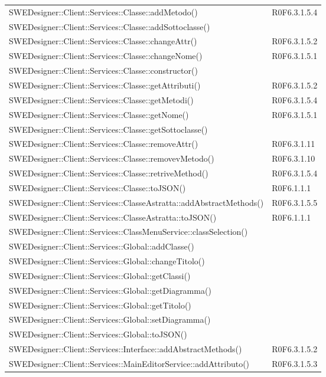 \begin{center}
\begin{longtable}{p{13cm}!{\VRule[1pt]}p{2cm}}
SWEDesigner::Client::Services::Classe::addMetodo() & R0F6.3.1.5.4\\
SWEDesigner::Client::Services::Classe::addSottoclasse() & \\
SWEDesigner::Client::Services::Classe::changeAttr() & R0F6.3.1.5.2\\
SWEDesigner::Client::Services::Classe::changeNome() & R0F6.3.1.5.1\\
SWEDesigner::Client::Services::Classe::constructor() & \\
SWEDesigner::Client::Services::Classe::getAttributi() & R0F6.3.1.5.2\\
SWEDesigner::Client::Services::Classe::getMetodi() & R0F6.3.1.5.4\\
SWEDesigner::Client::Services::Classe::getNome() & R0F6.3.1.5.1\\
SWEDesigner::Client::Services::Classe::getSottoclasse() & \\
SWEDesigner::Client::Services::Classe::removeAttr() & R0F6.3.1.11\\
SWEDesigner::Client::Services::Classe::removevMetodo() & R0F6.3.1.10\\
SWEDesigner::Client::Services::Classe::retriveMethod() & R0F6.3.1.5.4\\
SWEDesigner::Client::Services::Classe::toJSON() & R0F6.1.1.1\\
SWEDesigner::Client::Services::ClasseAstratta::addAbstractMethods() & R0F6.3.1.5.5\\
SWEDesigner::Client::Services::ClasseAstratta::toJSON() & R0F6.1.1.1\\
SWEDesigner::Client::Services::ClassMenuService::classSelection() & \\
SWEDesigner::Client::Services::Global::addClasse() & \\
SWEDesigner::Client::Services::Global::changeTitolo() & \\
SWEDesigner::Client::Services::Global::getClassi() & \\
SWEDesigner::Client::Services::Global::getDiagramma() & \\
SWEDesigner::Client::Services::Global::getTitolo() & \\
SWEDesigner::Client::Services::Global::setDiagramma() & \\
SWEDesigner::Client::Services::Global::toJSON() & \\
SWEDesigner::Client::Services::Interface::addAbstractMethods() & R0F6.3.1.5.2\\
SWEDesigner::Client::Services::MainEditorService::addAttributo() & R0F6.3.1.5.3\\

\end{longtable}
\end{center}
